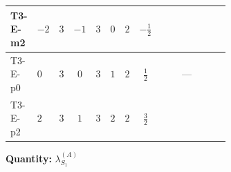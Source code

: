 \documentclass[8pt]{article}
\begin{document}
\begin{landscape}
\begin{longtable}{@{}llcccccc >{\raggedright\arraybackslash}p{0.21\linewidth} >{\raggedright\arraybackslash}p{0.21\linewidth} >{\raggedright\arraybackslash}p{0.21\linewidth}@{}}
\midrule
T3-E-m2 & $-2$ & $3$ & $-1$ & $3$ & $0$ & $2$ & $-\frac{1}{2}$ & \scriptsize\adjustbox{max width=\linewidth}{$\begin{gathered} +\frac{3 {g_2}^4}{4}\end{gathered}$} & \scriptsize\adjustbox{max width=\linewidth}{$\begin{gathered} +{g_1}^2 \left(9 {g_2}^2-\frac{3 {\lambda_{S_1}^{(1)}}}{2}-12 {\lambda_{S_1}^{(A)}}\right)\end{gathered}$} & \scriptsize\adjustbox{max width=\linewidth}{$\begin{gathered} +{g_2}^2 (-3 {\lambda_{S_1}^{(1)}}-24 {\lambda_{S_1}^{(A)}})\end{gathered}$} \\
\midrule
T3-E-p0 & $0$ & $3$ & $0$ & $3$ & $1$ & $2$ & $\frac{1}{2}$ & \scriptsize\adjustbox{max width=\linewidth}{$\begin{gathered} +\frac{3 {g_2}^4}{4}\end{gathered}$} & --- & \scriptsize\adjustbox{max width=\linewidth}{$\begin{gathered} +{g_2}^2 (-3 {\lambda_{S_1}^{(1)}}-24 {\lambda_{S_1}^{(A)}})\end{gathered}$} \\
\midrule
T3-E-p2 & $2$ & $3$ & $1$ & $3$ & $2$ & $2$ & $\frac{3}{2}$ & \scriptsize\adjustbox{max width=\linewidth}{$\begin{gathered} +\frac{3 {g_2}^4}{4}\end{gathered}$} & \scriptsize\adjustbox{max width=\linewidth}{$\begin{gathered} +{g_1}^2 \left(9 {g_2}^2-\frac{3 {\lambda_{S_1}^{(1)}}}{2}-12 {\lambda_{S_1}^{(A)}}\right)\end{gathered}$} & \scriptsize\adjustbox{max width=\linewidth}{$\begin{gathered} +{g_2}^2 (-3 {\lambda_{S_1}^{(1)}}-24 {\lambda_{S_1}^{(A)}})\end{gathered}$} \\
\midrule
\bottomrule
\end{longtable}
\clearpage
\noindent\textbf{Quantity: }$\lambda_{S_1}^{(A)}$\par\smallskip

\end{landscape}
\end{document}
